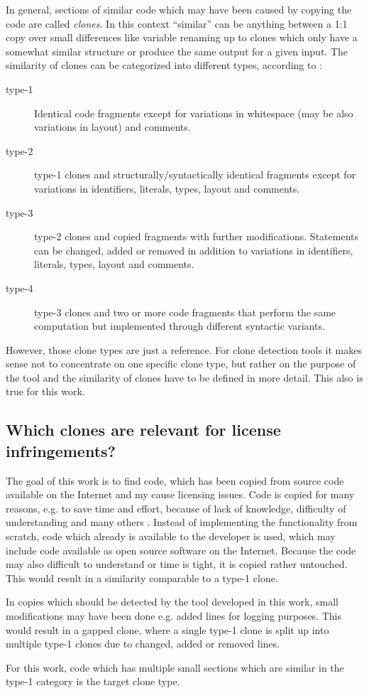 In general, sections of similar code which may have been caused by copying the code are called \textit{clones}.
In this context ``similar'' can be anything between a 1:1 copy over small differences like variable renaming up to clones which only have a somewhat similar structure or produce the same output for a given input.
The similarity of clones can be categorized into different types, according to \cite{roy2007survey}:

\begin{description}
	\item[type-1] Identical code fragments except for variations in whitespace (may be also variations in layout) and comments.
	\item[type-2] type-1 clones and structurally/syntactically identical fragments except for variations in identifiers, literals, types, layout and comments.
	\item[type-3] type-2 clones and copied fragments with further modifications. Statements can be changed, added or removed in addition to variations in identifiers, literals, types, layout and comments.
	\item[type-4] type-3 clones and two or more code fragments that perform the same computation but implemented through different syntactic variants.
\end{description}

However, those clone types are just a reference.
For clone detection tools it makes sense not to concentrate on one specific clone type, but rather on the purpose of the tool and the similarity of clones have to be defined in more detail.
This also is true for this work.
 
\subsection*{Which clones are relevant for license infringements?}
The goal of this work is to find code, which has been copied from source code available on the Internet and my cause licensing issues.
Code is copied for many reasons, e.g. to save time and effort, because of lack of knowledge, difficulty of understanding and many others \cite{roy2007survey}.
Instead of implementing the functionality from scratch, code which already is available to the developer is used, which may include code available as open source software on the Internet.
Because the code may also difficult to understand or time is tight, it is copied rather untouched.
This would result in a similarity comparable to a type-1 clone.

In copies which should be detected by the tool developed in this work, small modifications may have been done e.g. added lines for logging purposes.
This would result in a gapped clone, where a single type-1 clone is split up into multiple type-1 clones due to changed, added or removed lines.

For this work, code which has multiple small sections which are similar in the type-1 category is the target clone type.